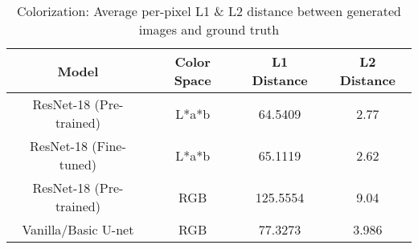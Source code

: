 \begin{table}[!htb]
\centering
\setlength{\tabcolsep}{4pt} %
\renewcommand{\arraystretch}{1} %
\footnotesize
\begin{tabular}{c | c | c | c}
        \hline
        \hline
        \textbf{Model} & \textbf{Color Space} & \textbf{
        L1 Distance} & \textbf{L2 Distance}\\
        \hline
        ResNet-18 (Pre-trained) & L*a*b & 64.5409 & 2.77\\
        ResNet-18 (Fine-tuned) & L*a*b & 65.1119 & 2.62\\
        ResNet-18 (Pre-trained) & RGB & 125.5554 & 9.04\\
        Vanilla/Basic U-net & RGB & 77.3273 & 3.986\\
        \hline
    \end{tabular}
\caption{Colorization: Average per-pixel L1 \& L2 distance between generated images and ground truth}
\label{tab:colorization_results}
\end{table}